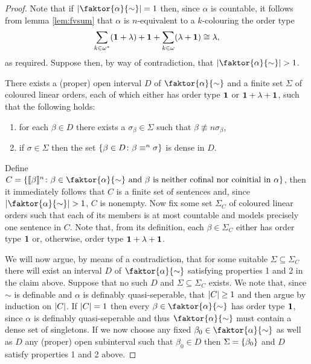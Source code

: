 \begin{proof}
	Note that if $\card{\faktor{\alpha}{\sim}}=1$ then, since $\alpha$ is countable, it follows from lemma \ref{lem:fvsum} that $\alpha$ is $n$-equivalent to a $k$-colouring the order type
	\begin{equation}
		\sum_{k\in{\omega}^\ast}(\mathbf{1}+\lambda)+\mathbf{1}+\sum_{k\in\omega}(\lambda+\mathbf{1})\cong\lambda,
	\end{equation}
	as required.  Suppose then, by way of contradiction, that $\card{\faktor{\alpha}{\sim}}>1$.
	\begin{claim}
		There exists a (proper) open interval $D$ of $\faktor{\alpha}{\sim}$ and a finite set $\Sigma$ of coloured linear orders, each of which either has order type $\mathbf{1}$ or $\mathbf{1}+\lambda+\mathbf{1}$, such that the following holds:
		\begin{enumerate}[nosep]
			\item for each $\beta\in D$ there exists a $\sigma_\beta\in\Sigma$  such that $\beta\nequiv{n}\sigma_\beta$,

			\item if $\sigma\in\Sigma$ then the set $\left\lbrace \beta\in D\colon \beta\equiv^{n}\sigma \right\rbrace$ is dense in $D$.
		\end{enumerate}
	\end{claim}

	Define $C=\setbuild{\cha{\beta}{n}}{\beta\in\faktor{\alpha}{\sim}\text{ and }\beta\text{ is neither cofinal nor coinitial in }\alpha}$, then it immediately follows that $C$ is a finite set of sentences and, since $\card{\faktor{\alpha}{\sim}}>1$, $C$ is nonempty.  Now fix some set $\Sigma_C$ of coloured linear orders such that each of its members is at most countable and models precisely one sentence in $C$.  Note that, from its definition, each $\beta\in\Sigma_C$ either has order type $\mathbf{1}$ or, otherwise, order type $\mathbf{1}+\lambda+\mathbf{1}$.

	We will now argue, by means of a contradiction, that for some suitable $\Sigma\subseteq\Sigma_C$ there will exist an interval $D$ of $\faktor{\alpha}{\sim}$ satisfying properties 1 and 2 in the claim above.  Suppose that no such $D$ and $\Sigma\subseteq\Sigma_C$ exists.  We note that, since $\sim$ is definable and $\alpha$ is definably quasi-seperable, that $\left\lvert C\right\rvert\geq 1$ and then argue by induction on $\left\lvert C\right\rvert$.  If $\left\lvert C\right\rvert=1$ then every $\beta\in\faktor{\alpha}{\sim}$ has order type $\mathbf{1}$, since $\alpha$ is definably quasi-seperable and thus $\faktor{\alpha}{\sim}$ must contain a dense set of singletons.  If we now choose any fixed $\beta_0\in\faktor{\alpha}{\sim}$ as well as $D$ any (proper) open subinterval such that $\beta_0\in D$ then $\Sigma=\left\lbrace \beta_0\right\rbrace$ and $D$ satisfy properties 1 and 2 above.


\end{proof}
